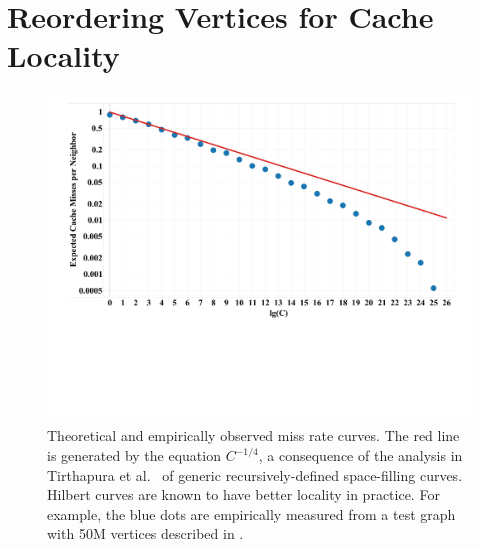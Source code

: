 \section{Reordering Vertices for Cache Locality} 
\label{sec:reordering}

\begin{figure}[h]
\centering
\includegraphics[width=5in,clip,trim=1cm 6cm 0 0]{figures/miss_rate_curve.pdf}
\caption{Theoretical and empirically observed miss rate curves.  The red
line is generated by the equation $C^{-1/4}$, a consequence of the
analysis in Tirthapura et al.~\cite{TirthapuraSeAl06} of generic
recursively-defined space-filling curves.  Hilbert curves are known to
have better locality in practice.  For example, 
the blue dots are empirically measured
from a test graph with 50M vertices described in .
}
\label{fig:miss_rate_curve}
\end{figure}


